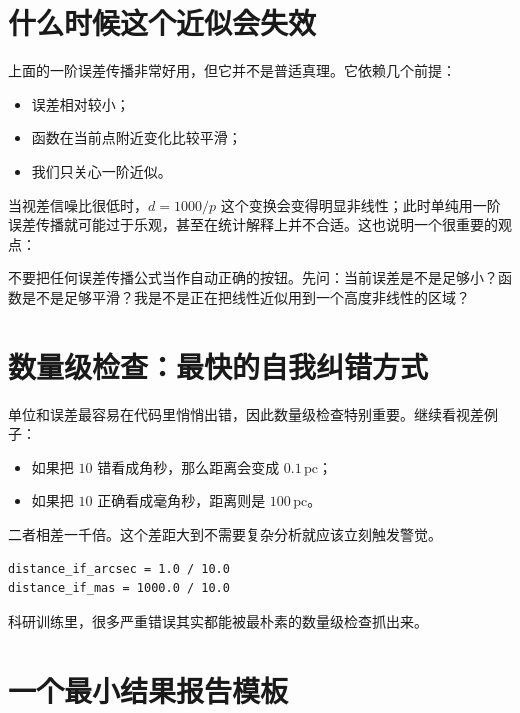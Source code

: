 \section{什么时候这个近似会失效}

上面的一阶误差传播非常好用，但它并不是普适真理。它依赖几个前提：

\begin{itemize}
    \item 误差相对较小；
    \item 函数在当前点附近变化比较平滑；
    \item 我们只关心一阶近似。
\end{itemize}

当视差信噪比很低时，$d=1000/p$ 这个变换会变得明显非线性；此时单纯用一阶误差传播就可能过于乐观，甚至在统计解释上并不合适。这也说明一个很重要的观点：

\begin{protip}[误差公式也有适用边界]
不要把任何误差传播公式当作自动正确的按钮。先问：当前误差是不是足够小？函数是不是足够平滑？我是不是正在把线性近似用到一个高度非线性的区域？
\end{protip}

\section{数量级检查：最快的自我纠错方式}

单位和误差最容易在代码里悄悄出错，因此数量级检查特别重要。继续看视差例子：

\begin{itemize}
    \item 如果把 $10$ 错看成角秒，那么距离会变成 $0.1\,\mathrm{pc}$；
    \item 如果把 $10$ 正确看成毫角秒，距离则是 $100\,\mathrm{pc}$。
\end{itemize}

二者相差一千倍。这个差距大到不需要复杂分析就应该立刻触发警觉。

\begin{examplebox}[单位错误的数量级后果]
\begin{lstlisting}[style=pythonstyle]
distance_if_arcsec = 1.0 / 10.0
distance_if_mas = 1000.0 / 10.0
\end{lstlisting}
\end{examplebox}

科研训练里，很多严重错误其实都能被最朴素的数量级检查抓出来。

\section{一个最小结果报告模板}

